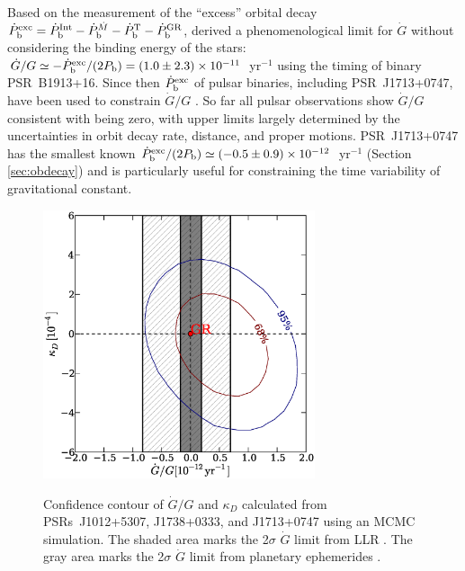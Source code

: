 Based on the measurement of the ``excess'' orbital decay 
$\dot{P}_{\rm b}^{\rm exc}=\dot{P}_{\rm b}^{\rm Int} - \dot{P}_{\rm
b}^{\dot{M}}  - \dot{P}_{\rm b}^{\rm T} - \dot{P}_{\rm b}^{\rm GR}$,
\citet{dgt88} derived a phenomenological limit for $\dot{G}$ without considering the binding energy of the stars: 
$\dot{G}/G\simeq-\dot{P}_{\rm b}^{\rm exc}/(2P_{\rm
b})=(1.0\pm2.3)\times10^{-11}$~yr$^{-1}$ using the timing of binary PSR~B1913+16. 
Since then $\dot{P}_{\rm b}^{\rm exc}$ of pulsar binaries, including 
PSR~J1713+0747, have been used to 
constrain $\dot{G}/G$ \citep{ktr94, nss+05, dvtb08, lwj+09, fwe+12}. 
So far all pulsar observations show $\dot{G}/G$ consistent with being zero, with 
upper limits largely determined by the uncertainties in orbit decay rate, distance, 
and proper motions.
PSR~J1713+0747 has the smallest known $\dot{P}_{\rm b}^{\rm exc}/(2P_{\rm
b})\simeq(-0.5\pm0.9)\times10^{-12}$~yr$^{-1}$ (Section \ref{sec:obdecay}) and is
particularly useful for constraining the time variability of gravitational
constant.

\begin{figure}
\includegraphics[width=8cm]{finalGdot.ps} \\ 
\caption {\label{fig:Gdot} Confidence contour of $\dot{G}/G$ and $\kappa_D$
calculated from PSRs~J1012+5307, J1738+0333, and J1713+0747 using an MCMC simulation.
The shaded area marks the 2$\sigma$ $\dot{G}$ limit from LLR \citep{hmb10}. The gray area
marks the 2$\sigma$ $\dot{G}$ limit from planetary ephemerides \citep{fle+14}.
} 
\end{figure} 

